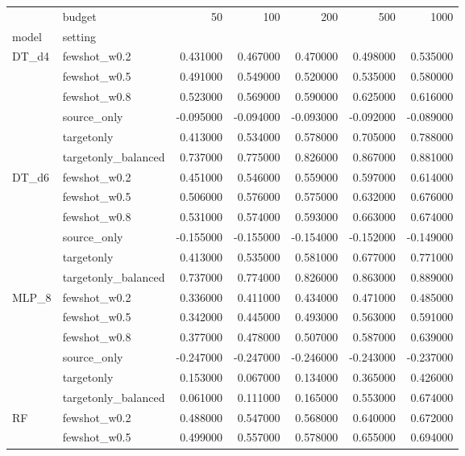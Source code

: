 \begin{tabular}{llrrrrr}
\toprule
 & budget & 50 & 100 & 200 & 500 & 1000 \\
model & setting &  &  &  &  &  \\
\midrule
\multirow[t]{6}{*}{DT_d4} & fewshot_w0.2 & 0.431000 & 0.467000 & 0.470000 & 0.498000 & 0.535000 \\
 & fewshot_w0.5 & 0.491000 & 0.549000 & 0.520000 & 0.535000 & 0.580000 \\
 & fewshot_w0.8 & 0.523000 & 0.569000 & 0.590000 & 0.625000 & 0.616000 \\
 & source_only & -0.095000 & -0.094000 & -0.093000 & -0.092000 & -0.089000 \\
 & targetonly & 0.413000 & 0.534000 & 0.578000 & 0.705000 & 0.788000 \\
 & targetonly_balanced & 0.737000 & 0.775000 & 0.826000 & 0.867000 & 0.881000 \\
\cline{1-7}
\multirow[t]{6}{*}{DT_d6} & fewshot_w0.2 & 0.451000 & 0.546000 & 0.559000 & 0.597000 & 0.614000 \\
 & fewshot_w0.5 & 0.506000 & 0.576000 & 0.575000 & 0.632000 & 0.676000 \\
 & fewshot_w0.8 & 0.531000 & 0.574000 & 0.593000 & 0.663000 & 0.674000 \\
 & source_only & -0.155000 & -0.155000 & -0.154000 & -0.152000 & -0.149000 \\
 & targetonly & 0.413000 & 0.535000 & 0.581000 & 0.677000 & 0.771000 \\
 & targetonly_balanced & 0.737000 & 0.774000 & 0.826000 & 0.863000 & 0.889000 \\
\cline{1-7}
\multirow[t]{6}{*}{MLP_8} & fewshot_w0.2 & 0.336000 & 0.411000 & 0.434000 & 0.471000 & 0.485000 \\
 & fewshot_w0.5 & 0.342000 & 0.445000 & 0.493000 & 0.563000 & 0.591000 \\
 & fewshot_w0.8 & 0.377000 & 0.478000 & 0.507000 & 0.587000 & 0.639000 \\
 & source_only & -0.247000 & -0.247000 & -0.246000 & -0.243000 & -0.237000 \\
 & targetonly & 0.153000 & 0.067000 & 0.134000 & 0.365000 & 0.426000 \\
 & targetonly_balanced & 0.061000 & 0.111000 & 0.165000 & 0.553000 & 0.674000 \\
\cline{1-7}
\multirow[t]{6}{*}{RF} & fewshot_w0.2 & 0.488000 & 0.547000 & 0.568000 & 0.640000 & 0.672000 \\
 & fewshot_w0.5 & 0.499000 & 0.557000 & 0.578000 & 0.655000 & 0.694000 \\

\end{tabular}
